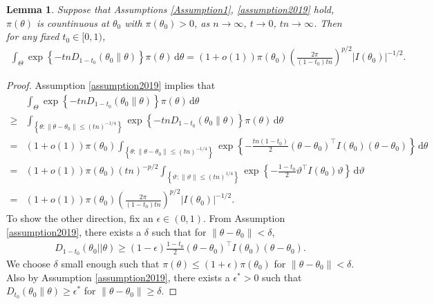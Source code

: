 \documentclass[11pt]{article}
\theoremstyle{plain}
\newtheorem{lemma}{\quad\quad Lemma}
\theoremstyle{definition}
\theoremstyle{remark}
\begin{document}
\begin{appendices}
\begin{lemma}
    Suppose that Assumptions \ref{Assumption1}, \ref{assumption2019} hold, $\pi(\theta)$ is countinuous at $\theta_0$ with $\pi(\theta_0) > 0 $, as $n \to \infty$, $t \to 0$, $tn \to \infty$.
    Then for any fixed $t_0 \in [0,1)$, 
\begin{align}
    \int_{\Theta} \exp\left\{ -tn D_{1-t_0} \left( \theta_0 \| \theta \right) \right\} \pi(\theta) \, \mathrm d \theta= (1+o(1))\pi(\theta_0)
    \left( 
        \frac{2\pi}{(1-t_0) tn}
    \right)^{p/2}
    | I (\theta_0) |^{-1/2}. 
    \label{eq:fort0}
\end{align}
    \label{lemma:2019}
\end{lemma}
\begin{proof}
Assumption \ref{assumption2019} implies that
\begin{align*}
    &\int_{\Theta} \exp\left\{ -tn D_{1-t_0} (\theta_0 \| \theta) \right\} \pi(\theta) \, \mathrm d \theta
    \\
    \geq
    &\int_{ \left\{ \theta: \|\theta - \theta_0\|\leq (tn)^{-1/4} \right\}} \exp\left\{ -tn D_{1-t_0} (\theta_0 \| \theta) \right\} \pi(\theta) \, \mathrm d \theta
    \\
    =
    &(1+o(1))\pi(\theta_0)\int_{ \left\{ \theta: \|\theta - \theta_0\|\leq (tn)^{-1/4} \right\}} \exp \left\{ - \frac{tn(1-t_0)}{2} (\theta- \theta_0)^\top I(\theta_0) (\theta- \theta_0) \right\}   \, \mathrm d \theta
    \\
    =
    &(1+o(1))\pi(\theta_0) (tn)^{-p/2} \int_{ \left\{ \vartheta: \|\vartheta\|\leq (tn)^{1/4} \right\}} \exp \left\{ - \frac{1-t_0}{2} \vartheta^\top I(\theta_0) \vartheta \right\} \, \mathrm d \vartheta
    \\
    =
    &(1+o(1))\pi(\theta_0)
    \left( 
        \frac{2\pi}{(1-t_0) tn}
    \right)^{p/2}
    |I(\theta_0)|^{-1/2}
    .
\end{align*}
To show the other direction, fix an $\epsilon \in (0, 1)$.
From Assumption \ref{assumption2019}, there exists a $\delta$ such that for $\|\theta - \theta_0\| < \delta$,
\begin{align*}
D_{1-t_0} (\theta_0 || \theta) \geq (1-\epsilon) \frac{1-t_0}{2} (\theta -\theta_0)^\top I(\theta_0) (\theta - \theta_0).
\end{align*}
We choose $\delta$ small enough such that $\pi(\theta) \leq (1+\epsilon) \pi(\theta_0) $ for $\|\theta - \theta_0\| < \delta$.
Also by Assumption \ref{assumption2019}, there exists a $\epsilon^* >0$ such that $D_{t_0} (\theta_0 \| \theta) \geq \epsilon^*$ for $\|\theta - \theta_0\|\geq \delta$.

\end{proof}
\end{appendices}
\end{document}
